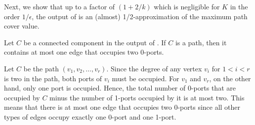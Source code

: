 Next, we show that up to a factor of $(1+2/k)$ which is negligible for $K$ in the order $1/\epsilon$, the output of \algtwo{} is an (almost) 1/2-approximation of the maximum path cover value.

\begin{observation}\label{obs:one-zero-path}
Let $C$ be a connected component in the output of \algtwo{}. If $C$ is a path, then it contains at most one edge that occupies two 0-ports.
\end{observation}
\begin{myproof}
    Let $C$ be the path $(v_1, v_2, \ldots, v_r)$. Since the degree of any vertex $v_i$ for $1<i<r$ is two in the path, both ports of $v_i$ must be occupied. For $v_1$ and $v_r$, on the other hand, only one port is occupied. Hence, the total number of 0-ports that are occupied by $C$ minus the number of 1-ports occupied by it is at most two. This means that there is at most one edge that occupies two 0-ports since all other types of edges occupy exactly one 0-port and one 1-port.
\end{myproof}




